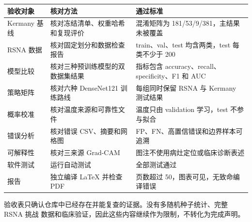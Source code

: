\documentclass[
]{ctexart}
\begin{document}
\begin{longtable}[]{@{}p{}p{}p{}@{}}
\toprule
验收对象 & 核对方法 & 通过标准 \\
\midrule
Kermany 基线 & 核对冻结清单、权重哈希和复现评价 & 混淆矩阵为 181/53/9/381，主结果未被覆盖 \\
RSNA 数据 & 核对固定划分和数据检查报告 & train、val、test 均含两类，test 每类不少于 200 \\
模型比较 & 核对三种预训练模型的双数据集结果 & 指标包含 accuracy、recall、specificity、F1 和 AUC \\
策略矩阵 & 核对六种 DenseNet121 训练路线 & 每组同时保留 RSNA 与 Kermany 测试结果 \\
概率校准 & 核对温度来源和可靠性文件 & 温度只由 validation 学习，test 不参与拟合 \\
错误分析 & 核对错误 CSV、摘要和网格图 & FP、FN、高置信错误和边界样本可追溯 \\
可解释性 & 核对三来源 Grad-CAM & 图注不使用病灶定位或临床诊断表述 \\
软件测试 & 运行自动测试 & 全部测试通过 \\
报告 & 独立编译 LaTeX 并检查 PDF & 页数超过 50，图表可见，无致命编译错误 \\
\bottomrule
\end{longtable}

验收表只确认仓库中已经存在并能复查的证据。没有多随机种子统计、完整 RSNA 挑战
数据和临床验证，因此这些内容继续作为限制，不转化为完成声明。
\end{document}
